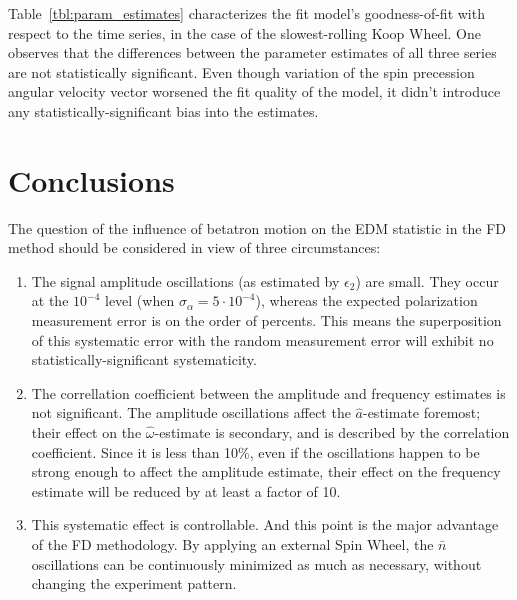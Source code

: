 \documentclass[a4paper]{jacow}
\newcommand{\w}{\omega}
\newcommand{\nbar}{\bar n}
\begin{document}
Table~\ref{tbl:param_estimates} characterizes the fit model's goodness-of-fit with respect to the time series,
in the case of the slowest-rolling Koop Wheel.
One observes that the differences between the parameter estimates of all three series are not
statistically significant. Even though variation of the spin precession angular velocity vector worsened
the fit quality of the model, it didn't introduce any statistically-significant bias
into the estimates.

\section{Conclusions}
The question of the influence of betatron motion on the EDM statistic in the FD method should be considered
in view of three circumstances:
\begin{enumerate}
\item The signal amplitude oscillations (as estimated by $\epsilon_2$) are small.
  They occur at the $10^{-4}$ level (when $\sigma_{\alpha}=5\cdot 10^{-4}$), whereas
  the expected polarization measurement error is on the order of percents.
  This means the superposition of this systematic error with the random measurement error
  will exhibit no statistically-significant systematicity.
\item The correllation coefficient between the amplitude and frequency estimates is not significant. The amplitude
  oscillations affect the $\hat a$-estimate foremost; their effect on the $\hat\w$-estimate is secondary, and is
  described by the correlation coefficient. Since it is less than 10\%, even if the oscillations happen to be
  strong enough to affect the amplitude estimate, their effect on the frequency estimate will be reduced by
  at least a factor of 10.
\item This systematic effect is controllable. And this point is the major advantage of the FD methodology.
  By applying an external Spin Wheel, the $\nbar$ oscillations can be continuously minimized
  as much as necessary, without changing the experiment pattern.
\end{enumerate}
\end{document}
